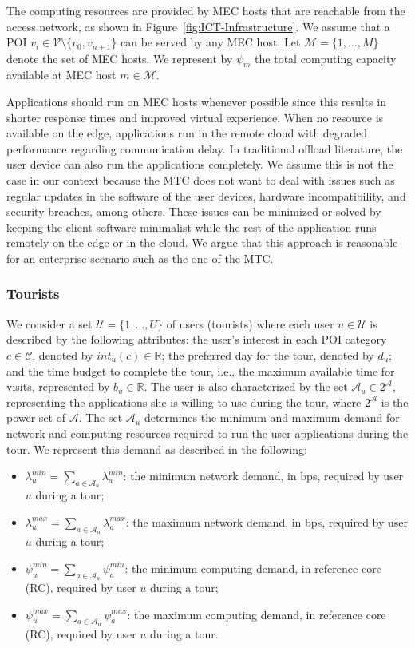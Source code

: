 The computing resources are provided by MEC hosts that are reachable from the access network, as shown in Figure~\ref{fig:ICT-Infrastructure}. We assume that a POI $v_{i} \in \mathcal{V} \setminus \{v_{0}, v_{n+1}\}$ can be served by any MEC host. Let $\mathcal{M} = \{1, \dots, M\}$ denote the set of MEC hosts. We represent by ${\psi}_{m}$ the total computing capacity available at MEC host $m \in \mathcal{M}$.

Applications should run on MEC hosts whenever possible since this results in shorter response times and improved virtual experience. When no resource is available on the edge, applications run in the remote cloud with degraded performance regarding communication delay. {In traditional offload literature, the user device can also run the applications completely. We assume this is not the case in our context because the MTC does not want to deal with issues such as regular updates in the software of the user devices, hardware incompatibility, and security breaches, among others. These issues can be minimized or solved by keeping the client software minimalist while the rest of the application runs remotely on the edge or in the cloud. We argue that this approach is reasonable for an enterprise scenario such as the one of the MTC.} 

\subsubsection{\textbf{Tourists}}
We consider a set $\mathcal{U} = \{1, \dots, U\}$ of users (tourists) where each user $u \in \mathcal{U}$ is described by the following attributes: the user's interest in each POI category $c \in \mathcal{C}$, denoted by $int_{u}(c) \in \mathbb{R}$; the preferred day for the tour, denoted by $d_u$; and the time budget to complete the tour, i.e., the maximum available time for visits,  represented by $b_u \in \mathbb{R}$. The user is also characterized by the set $\mathcal{A}_{u} \in 2^{\mathcal{A}}$, representing the applications she is willing to use during the tour, where $2^{\mathcal{A}}$ is the power set of $\mathcal{A}$. The set $\mathcal{A}_{u}$ determines the minimum and maximum demand for network and computing resources required to run the user applications during the tour. We represent this demand as described in the following:
\begin{itemize}
    \item $\lambda_{u}^{min} = \sum\limits_{a \in \mathcal{A}_{u}} \lambda^{min}_{a}$: the minimum network demand, in bps, required by user $u$ during a tour;
    \item $\lambda_{u}^{max} = \sum\limits_{a \in \mathcal{A}_{u}} \lambda^{max}_{a}$: the maximum network demand, in bps, required by user $u$ during a tour;
    \item $\psi_{u}^{min} = \sum\limits_{a \in \mathcal{A}_{u}} \psi^{min}_{a}$: the minimum computing demand, in reference core (RC), required by user $u$ during a tour; 
    \item $\psi_{u}^{max} = \sum\limits_{a \in \mathcal{A}_{u}} \psi^{max}_{a}$: the maximum computing demand, in reference core (RC), required by user $u$ during a tour.
\end{itemize}

